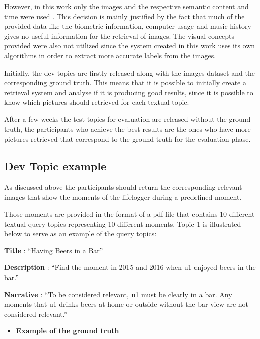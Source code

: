     
    However, in this work only the images and the respective semantic content and time were used \cite{Ribeiro2020}. This decision is mainly justified by the fact that much of the provided data like the biometric information, computer usage and music history gives no useful information for the retrieval of images. The visual concepts provided were also not utilized since the system created in this work uses its own algorithms in order to extract more accurate labels from the images. 
    

    Initially, the dev topics are firstly released along with the images dataset and the corresponding ground truth. This means that it is possible to initially create a retrieval system and analyse if it is producing good results, since it is possible to know which pictures should retrieved for each textual topic. 

    After a few weeks the test topics for evaluation are released without the ground truth, the participants who achieve the best results are the ones who have more pictures retrieved that correspond to the ground truth for the evaluation phase.


    \newpage
    \subsection{Dev Topic example}
    \label{sec:devtopic1}
    As discussed above the participants should return the corresponding relevant images that show the moments of the lifelogger during a predefined moment. 
    
    Those moments are provided in the format of a pdf file that contains 10 different textual query topics representing 10 different moments. Topic 1 is illustrated below to serve as an example of the query topics:
    


   \hfill

        \textbf{Title} : ``Having Beers in a Bar”

        \textbf{Description} : ``Find the moment in 2015 and 2016 when u1 enjoyed beers in the bar.”

        \textbf{Narrative} : ``To be considered relevant, u1 must be clearly in a bar. Any moments that u1 drinks beers at home or outside without the bar view are not considered relevant.”
        


    
    \begin{itemize}
        \item    \textbf{Example of the ground truth}
    \end{itemize}
 


